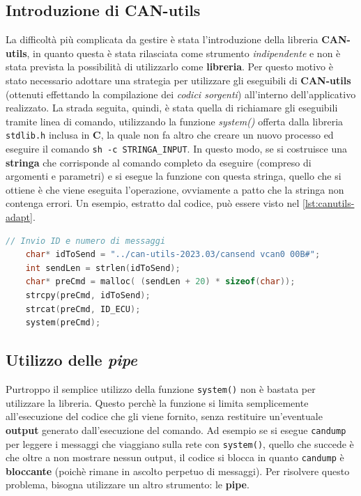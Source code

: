 \subsection{Introduzione di CAN-utils}
La difficoltà più complicata da gestire è stata l'introduzione della libreria \textbf{CAN-utils}, in quanto questa è stata rilasciata come strumento \emph{indipendente} e non è stata prevista la possibilità di utilizzarlo come \textbf{libreria}. Per questo motivo è stato necessario adottare una strategia per utilizzare gli eseguibili di \textbf{CAN-utils} (ottenuti effettando la compilazione dei \emph{codici sorgenti}) all'interno dell'applicativo realizzato. La strada seguita, quindi, è stata quella di richiamare gli eseguibili tramite linea di comando, utilizzando la funzione \emph{system()} offerta dalla libreria \texttt{stdlib.h} inclusa in \textbf{C}, la quale non fa altro che creare un nuovo processo ed eseguire il comando \texttt{sh -c STRINGA\_INPUT}. In questo modo, se si costruisce una \textbf{stringa} che corrisponde al comando completo da eseguire (compreso di argomenti e parametri) e si esegue la funzione con questa stringa, quello che si ottiene è che viene eseguita l'operazione, ovviamente a patto che la stringa non contenga errori. Un esempio, estratto dal codice, può essere visto nel \autoref{lst:canutils-adapt}.

\begin{lstlisting}[language=C, caption=Utilizzo di CAN-utils tramite linea di comando, label=lst:canutils-adapt]
    // Invio ID e numero di messaggi
    char* idToSend = "../can-utils-2023.03/cansend vcan0 00B#";
    int sendLen = strlen(idToSend);
    char* preCmd = malloc( (sendLen + 20) * sizeof(char));
    strcpy(preCmd, idToSend);
    strcat(preCmd, ID_ECU);
    system(preCmd);
\end{lstlisting}

\subsection{Utilizzo delle \emph{pipe}}
Purtroppo il semplice utilizzo della funzione \texttt{system()} non è bastata per utilizzare la libreria. Questo perchè la funzione si limita semplicemente all'esecuzione del codice che gli viene fornito, senza restituire un'eventuale \textbf{output} generato dall'esecuzione del comando. Ad esempio se si esegue \texttt{candump} per leggere i messaggi che viaggiano sulla rete con \texttt{system()}, quello che succede è che oltre a non mostrare nessun output, il codice si blocca in quanto \texttt{candump} è \textbf{bloccante} (poichè rimane in ascolto perpetuo di messaggi). Per risolvere questo problema, bisogna utilizzare un altro strumento: le \textbf{pipe}.

